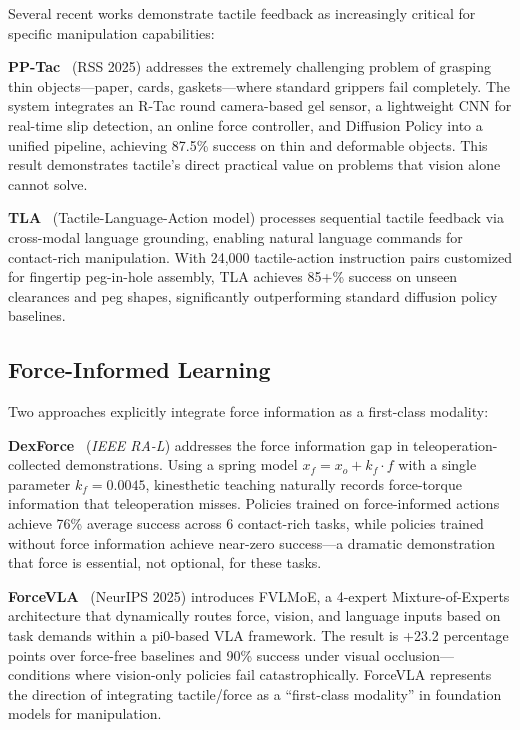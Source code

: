 Several recent works demonstrate tactile feedback as increasingly critical for specific manipulation capabilities:

\textbf{PP-Tac}~\cite{lin2025pptac} (RSS 2025) addresses the extremely challenging problem of grasping thin objects---paper, cards, gaskets---where standard grippers fail completely. The system integrates an R-Tac round camera-based gel sensor, a lightweight CNN for real-time slip detection, an online force controller, and Diffusion Policy into a unified pipeline, achieving 87.5\% success on thin and deformable objects. This result demonstrates tactile's direct practical value on problems that vision alone cannot solve.

\textbf{TLA}~\cite{hao2025tla} (Tactile-Language-Action model) processes sequential tactile feedback via cross-modal language grounding, enabling natural language commands for contact-rich manipulation. With 24{,}000 tactile-action instruction pairs customized for fingertip peg-in-hole assembly, TLA achieves 85+\% success on unseen clearances and peg shapes, significantly outperforming standard diffusion policy baselines.

\subsection{Force-Informed Learning}

Two approaches explicitly integrate force information as a first-class modality:

\textbf{DexForce}~\cite{chen2025dexforce} (\emph{IEEE RA-L}) addresses the force information gap in teleoperation-collected demonstrations. Using a spring model $x_f = x_o + k_f \cdot f$ with a single parameter $k_f = 0.0045$, kinesthetic teaching naturally records force-torque information that teleoperation misses. Policies trained on force-informed actions achieve 76\% average success across 6 contact-rich tasks, while policies trained without force information achieve near-zero success---a dramatic demonstration that force is essential, not optional, for these tasks.

\textbf{ForceVLA}~\cite{yu2025forcevla} (NeurIPS 2025) introduces FVLMoE, a 4-expert Mixture-of-Experts architecture that dynamically routes force, vision, and language inputs based on task demands within a pi0-based VLA framework. The result is +23.2 percentage points over force-free baselines and 90\% success under visual occlusion---conditions where vision-only policies fail catastrophically. ForceVLA represents the direction of integrating tactile/force as a ``first-class modality'' in foundation models for manipulation.

